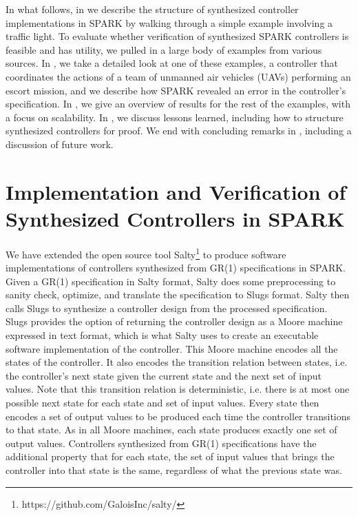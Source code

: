 \documentclass[runningheads]{llncs}
\begin{document}
In what follows, in  we describe the structure of synthesized controller implementations in SPARK 
by walking through a simple example involving a traffic light. 
To evaluate whether verification of synthesized SPARK controllers is feasible and has utility, 
we pulled in a large body of examples from various sources. 
In , we take a detailed look at one of these examples, a controller that coordinates the actions of 
a team of unmanned air vehicles (UAVs) performing an escort mission, 
and we describe how SPARK revealed an error in the controller's specification. 
In , we give an overview of results for the rest of the examples, with a focus on scalability. 
In , we discuss lessons learned, including how to structure synthesized controllers for proof.  
We end with concluding remarks in , including a discussion of future work.

\section{Implementation and Verification of Synthesized Controllers in SPARK}
\label{sec:implementation}

We have extended the open source tool Salty\footnote{https://github.com/GaloisInc/salty/} to produce software implementations of controllers synthesized from GR(1) specifications in SPARK. 
Given a GR(1) specification in Salty format, Salty does some preprocessing to sanity check, optimize, and translate the specification to Slugs format. 
Salty then calls Slugs to synthesize a controller design from the processed specification. 
Slugs provides the option of returning the controller design as a Moore machine expressed in text format, 
which is what Salty uses to create an executable software implementation of the controller. 
This Moore machine encodes all the states of the controller. %
It also encodes the transition relation between states, i.e. the controller's next state given the current state 
and the next set of input values. 
Note that this transition relation is deterministic, i.e. there is at most one possible next state for each state and set of input values. 
Every state then encodes a set of output values to be produced each time the controller transitions to that state. 
As in all Moore machines, each state produces exactly one set of output values. 
Controllers synthesized from GR(1) specifications have the additional property that for each state, 
the set of input values that brings the controller into that state is the same, regardless of what the previous state was.
\end{document}
